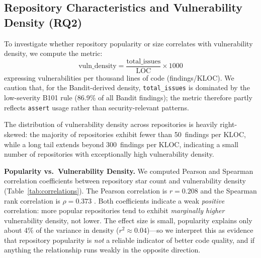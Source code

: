 \documentclass[sigconf,authordraft]{acmart}
\begin{document}
\subsection{Repository Characteristics and Vulnerability Density (RQ2)}

To investigate whether repository popularity or size correlates with
vulnerability density, we compute the metric:
\begin{equation}
  \text{vuln\_density} = \frac{\text{total\_issues}}{\text{LOC}} \times 1000
  \label{eq:density}
\end{equation}
expressing vulnerabilities per thousand lines of code (findings/KLOC).
We caution that, for the Bandit-derived density, \texttt{total\_issues}
is dominated by the low-severity B101 rule (86.9\% of all Bandit
findings); the metric therefore partly reflects \texttt{assert} usage
rather than security-relevant patterns.

The distribution of vulnerability density across repositories is
heavily right-skewed: the majority of repositories exhibit fewer than
50~findings per KLOC, while a long tail extends beyond
300~findings per KLOC, indicating a small number of repositories with
exceptionally high vulnerability density.

\textbf{Popularity vs.\ Vulnerability Density.}
We computed Pearson and Spearman correlation coefficients between
repository star count and vulnerability density
(Table~\ref{tab:correlations}). The Pearson correlation is
$r = 0.208$  and the Spearman rank correlation is
$\rho = 0.373$ . Both coefficients indicate a weak
\emph{positive} correlation: more popular repositories tend to exhibit
\emph{marginally higher} vulnerability density, not lower. The effect
size is small, popularity explains only about 4\% of the variance in
density ($r^2 \approx 0.04$)---so we interpret this as evidence that
repository popularity is \emph{not} a reliable indicator of better code
quality, and if anything the relationship runs weakly in the opposite
direction.
\end{document}
